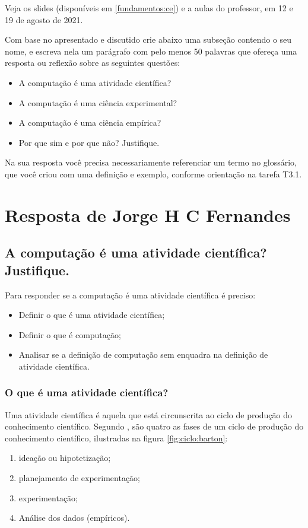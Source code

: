 
Veja os slides (disponíveis em \ref{fundamentos:ce}) e a aulas do professor, em 12 e 19 de agosto de 2021.

Com base no apresentado e discutido crie abaixo uma subseção contendo o seu nome, e escreva nela um parágrafo com pelo menos 50 palavras que ofereça uma resposta ou reflexão sobre as seguintes questões:

\begin{itemize}
    \item A computação é uma atividade científica? 
    \item A computação é uma ciência experimental? 
    \item A computação é uma ciência empírica? 
    \item Por que sim e por que não? 
Justifique. 
\end{itemize}

Na sua resposta você precisa necessariamente referenciar um termo no glossário, que você criou com uma definição e exemplo, conforme orientação na tarefa T3.1.

\section{Resposta de Jorge H C Fernandes}

\subsection{A computação é uma atividade científica? Justifique. }

Para responder se a computação é uma atividade científica é preciso:
\begin{itemize}
    \item Definir o que é uma atividade científica;
    \item Definir o que é computação;
    \item Analisar se a definição de computação sem enquadra na definição de atividade científica. 
\end{itemize}

\subsubsection{O que é uma atividade científica?} Uma atividade científica é aquela que está circunscrita ao ciclo de produção do conhecimento científico. Segundo \cite[p.2]{barton_graphical_1999}, são quatro as fases de um ciclo de produção do conhecimento científico, ilustradas na figura \ref{fig:ciclo:barton}:
\begin{enumerate}
    \item ideação ou hipotetização; 
    \item  planejamento de experimentação;
    \item  experimentação;
    \item Análise dos dados (empíricos).
\end{enumerate}

